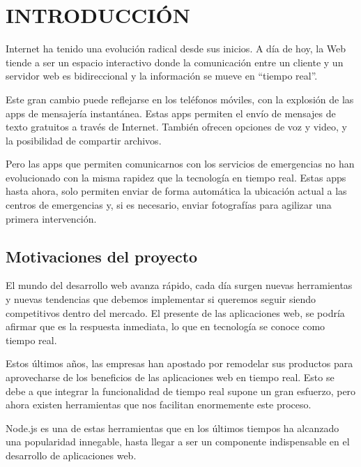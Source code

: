 \chapter{INTRODUCCIÓN}

\clearpage

Internet ha tenido una evolución radical desde sus inicios. A día de hoy, la Web tiende a ser un espacio interactivo donde la comunicación entre un cliente y un servidor web es bidireccional y la información se mueve en “tiempo real”.

Este gran cambio puede reflejarse en los teléfonos móviles, con la explosión de las apps de mensajería instantánea. Estas apps permiten el envío de mensajes de texto gratuitos a través de Internet. También ofrecen opciones de voz y video, y la posibilidad de compartir archivos.

Pero las apps que permiten comunicarnos con los servicios de emergencias no han evolucionado con la misma rapidez que la tecnología en tiempo real. Estas apps hasta ahora, solo permiten enviar de forma automática la ubicación actual a las centros de emergencias y, si es necesario, enviar fotografías para agilizar una primera intervención.

\section{Motivaciones del proyecto}


El mundo del desarrollo web avanza rápido, cada día surgen nuevas herramientas y nuevas tendencias que debemos implementar si queremos seguir siendo competitivos dentro del mercado. El presente de las aplicaciones web, se podría afirmar que es la respuesta inmediata, lo que en tecnología se conoce como tiempo real.

Estos últimos años, las empresas han apostado por remodelar sus productos para aprovecharse de los beneficios de las aplicaciones web en tiempo real. Esto se debe a que integrar la funcionalidad de tiempo real supone un gran esfuerzo, pero ahora existen herramientas que nos facilitan enormemente este proceso.

Node.js es una de estas herramientas que en los últimos tiempos ha alcanzado una popularidad innegable, hasta llegar a ser un componente indispensable en el desarrollo de aplicaciones web.

